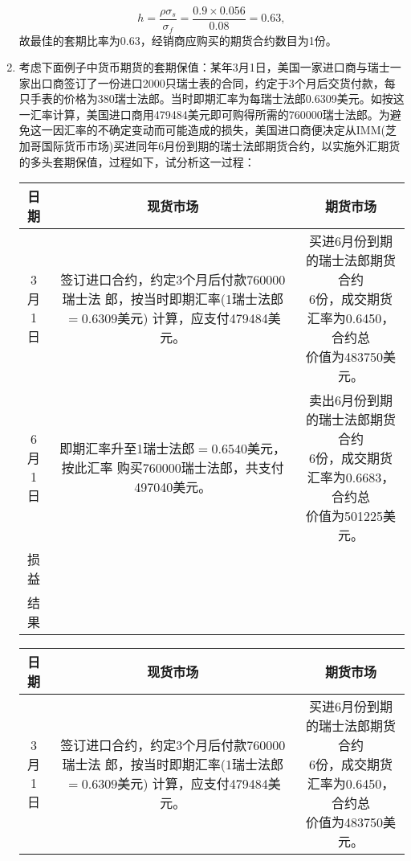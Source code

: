 \begin{enumerate}
    \[h = \frac{\rho \sigma_s}{\sigma_f} = \frac{0.9 \times 0.056}{0.08} = 0.63,\]
    故最佳的套期比率为0.63，经销商应购买的期货合约数目为1份。
    \item 考虑下面例子中货币期货的套期保值：某年3月1日，美国一家进口商与瑞士一家出口商签订了一份进口2000只瑞士表的合同，约定于3个月后交货付款，每只手表的价格为380瑞士法郎。当时即期汇率为每瑞士法郎0.6309美元。如按这一汇率计算，美国进口商用479484美元即可购得所需的760000瑞士法郎。为避免这一因汇率的不确定变动而可能造成的损失，美国进口商便决定从IMM(芝加哥国际货币市场)买进同年6月份到期的瑞士法郎期货合约，以实施外汇期货的多头套期保值，过程如下，试分析这一过程：
    \begin{center}
        \begin{tabular}{c|c|c}
            \hline
            日期 & 现货市场 & 期货市场 \\ \hline
            \tabincell{c}{3月\\1日} & \tabincell{l}{签订进口合约，约定3个月后付款760000瑞士法\\郎，按当时即期汇率(1瑞士法郎$=0.6309$美元)\\计算，应支付479484美元。} & \tabincell{l}{买进6月份到期的瑞士法郎期货合约\\6份，成交期货汇率为0.6450，合约总\\价值为483750美元。} \\ \hline
            \tabincell{c}{6月\\1日} & \tabincell{l}{即期汇率升至1瑞士法郎$=0.6540$美元，按此汇率\\购买760000瑞士法郎，共支付497040美元。} & \tabincell{l}{卖出6月份到期的瑞士法郎期货合约\\6份，成交期货汇率为0.6683，合约总\\价值为501225美元。} \\ \hline
            损益 & & \\ \hline
            结果 & \multicolumn{2}{|c}{} \\ \hline
        \end{tabular}
    \end{center}
    \sol
    \begin{center}
        \begin{tabular}{c|c|c}
            \hline
            日期 & 现货市场 & 期货市场 \\ \hline
            \tabincell{c}{3月\\1日} & \tabincell{l}{签订进口合约，约定3个月后付款760000瑞士法\\郎，按当时即期汇率(1瑞士法郎$=0.6309$美元)\\计算，应支付479484美元。} & \tabincell{l}{买进6月份到期的瑞士法郎期货合约\\6份，成交期货汇率为0.6450，合约总\\价值为483750美元。} \\ \hline

\end{tabular}
\end{center}
\end{enumerate}
